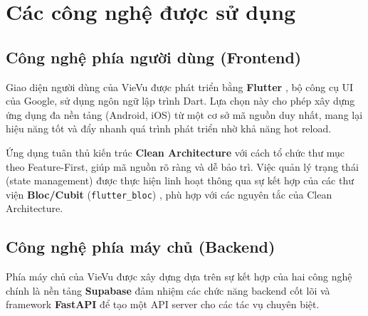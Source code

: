\section{Các công nghệ được sử dụng}

\subsection{Công nghệ phía người dùng (Frontend)}
\label{subsec:frontend_tech}

Giao diện người dùng của VieVu được phát triển bằng \textbf{Flutter} \cite{flutter_doc}, bộ công cụ UI của Google, sử dụng ngôn ngữ lập trình Dart. Lựa chọn này cho phép xây dựng ứng dụng đa nền tảng (Android, iOS) từ một cơ sở mã nguồn duy nhất, mang lại hiệu năng tốt và đẩy nhanh quá trình phát triển nhờ khả năng hot reload.

Ứng dụng tuân thủ kiến trúc \textbf{Clean Architecture} \cite{clean_arch} với cách tổ chức thư mục theo Feature-First, giúp mã nguồn rõ ràng và dễ bảo trì. Việc quản lý trạng thái (state management) được thực hiện linh hoạt thông qua sự kết hợp của các thư viện \textbf{Bloc/Cubit} (\texttt{flutter\_bloc}) \cite{bloc_package}, phù hợp với các nguyên tắc của Clean Architecture.

\subsection{Công nghệ phía máy chủ (Backend)}
\label{subsec:backend_tech}

Phía máy chủ của VieVu được xây dựng dựa trên sự kết hợp của hai công nghệ chính là nền tảng \textbf{Supabase} đảm nhiệm các chức năng backend cốt lõi và framework \textbf{FastAPI} để tạo một API server cho các tác vụ chuyên biệt.

